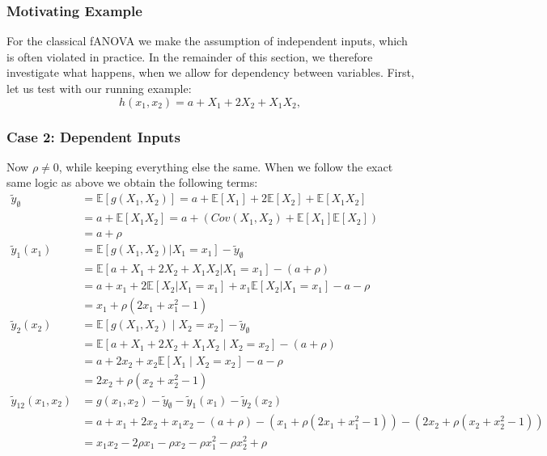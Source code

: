 \subsubsection{Motivating Example}
For the classical fANOVA we make the assumption of independent inputs, which is often violated in practice. In the remainder of this section, we therefore investigate what happens, when we allow for dependency between variables. First, let us test with our running example:
\[
h(x_1, x_2) = a + X_1 + 2X_2 + X_1 X_2,
\]

\subsubsection{Case 2: Dependent Inputs}
Now $\rho\neq 0$, while keeping everything else the same. When we follow the exact same logic as above we obtain the following terms:
\begin{align*}
\tilde{y}_{\emptyset} &= \mathbb{E}[g(X_1, X_2)] 
= a + \mathbb{E}[X_1] + 2\mathbb{E}[X_2] + \mathbb{E}[X_1 X_2] \\
&= a + \mathbb{E}[X_1 X_2] 
= a + \left( Cov(X_1, X_2) + \mathbb{E}[X_1]\mathbb{E}[X_2] \right) \\
&= a + \rho \\
\tilde{y}_1(x_1) 
&= \mathbb{E}[g(X_1, X_2) | X_1 = x_1] - \tilde{y}_{\emptyset} \\
&= \mathbb{E}[a + X_1 + 2X_2 + X_1 X_2 | X_1 = x_1] - (a + \rho) \\
&= a + x_1 + 2\mathbb{E}[X_2 | X_1 = x_1] + x_1 \mathbb{E}[X_2 | X_1 = x_1] - a - \rho \\
&= x_1 + \rho(2x_1 + x_1^2 - 1) \\
\tilde{y}_2(x_2) 
&= \mathbb{E}[g(X_1, X_2) \mid X_2 = x_2] - \tilde{y}_{\emptyset} \\
&= \mathbb{E}[a + X_1 + 2X_2 + X_1 X_2 \mid X_2 = x_2] - (a + \rho) \\
&= a + 2x_2 + x_2 \mathbb{E}[X_1 \mid X_2 = x_2] - a - \rho \\
&= 2x_2 + \rho(x_2 + x_2^2 - 1) \\
\tilde{y}_{12}(x_1, x_2) 
&= g(x_1, x_2) - \tilde{y}_{\emptyset} - \tilde{y}_1(x_1) - \tilde{y}_2(x_2) \\
&= a + x_1 + 2x_2 + x_1 x_2 - (a + \rho) - (x_1 + \rho(2x_1 + x_1^2 - 1)) - (2x_2 + \rho(x_2 + x_2^2 - 1))\\
&= x_1 x_2 - 2\rho x_1 - \rho x_2  - \rho x_1^2  - \rho x_2^2 + \rho
\end{align*}

